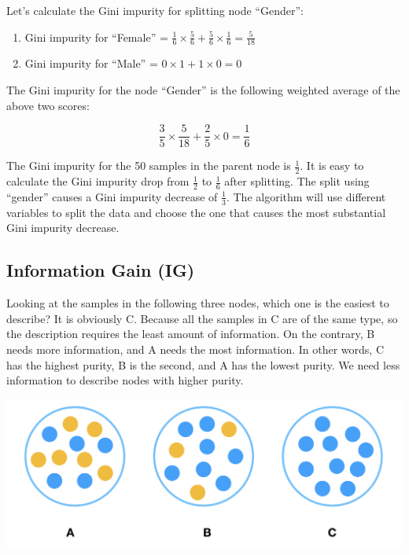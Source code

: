 \documentclass[
  12pt,
]{krantz}
\providecommand{\tightlist}{%
  \setlength{\itemsep}{0pt}\setlength{\parskip}{0pt}}
\begin{document}
Let's calculate the Gini impurity for splitting node ``Gender'':

\begin{enumerate}
\def\labelenumi{\arabic{enumi}.}
\tightlist
\item
  Gini impurity for ``Female'' = \(\frac{1}{6}\times\frac{5}{6}+\frac{5}{6}\times\frac{1}{6}=\frac{5}{18}\)
\item
  Gini impurity for ``Male'' = \(0\times1+1\times 0=0\)
\end{enumerate}

The Gini impurity for the node ``Gender'' is the following weighted average of the above two scores:

\[\frac{3}{5}\times\frac{5}{18}+\frac{2}{5}\times 0=\frac{1}{6}\]

The Gini impurity for the 50 samples in the parent node is \(\frac{1}{2}\). It is easy to calculate the Gini impurity drop from \(\frac{1}{2}\) to \(\frac{1}{6}\) after splitting. The split using ``gender'' causes a Gini impurity decrease of \(\frac{1}{3}\). The algorithm will use different variables to split the data and choose the one that causes the most substantial Gini impurity decrease.

\hypertarget{information-gain-ig}{%
\subsection{Information Gain (IG)}\label{information-gain-ig}}

Looking at the samples in the following three nodes, which one is the easiest to describe? It is obviously C. Because all the samples in C are of the same type, so the description requires the least amount of information. On the contrary, B needs more information, and A needs the most information. In other words, C has the highest purity, B is the second, and A has the lowest purity. We need less information to describe nodes with higher purity.

\includegraphics{images/InfoGainEN.PNG}
\end{document}
